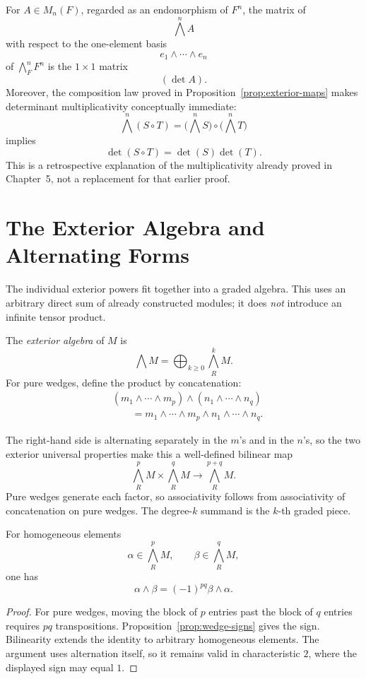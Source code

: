 For \(A\in M_n(F)\), regarded as an endomorphism of \(F^n\), the matrix of
\[
\bigwedge^nA
\]
with respect to the one-element basis
\[
e_1\wedge\cdots\wedge e_n
\]
of \(\bigwedge_F^nF^n\) is the \(1\times1\) matrix
\[
(\det A).
\]
Moreover, the composition law proved in Proposition~\ref{prop:exterior-maps}
makes determinant multiplicativity conceptually immediate:
\[
\bigwedge^n(S\circ T)
=\bigl(\bigwedge^nS\bigr)\circ\bigl(\bigwedge^nT\bigr)
\]
implies
\[
\det(S\circ T)=\det(S)\det(T).
\]
This is a retrospective explanation of the multiplicativity already proved
in Chapter~5, not a replacement for that earlier proof.

\section{The Exterior Algebra and Alternating Forms}\label{sec:exterior-forms}
The individual exterior powers fit together into a graded algebra.  This
uses an arbitrary direct sum of already constructed modules; it does
\emph{not} introduce an infinite tensor product.

\begin{definition}
The \emph{exterior algebra} of \(M\) is
\[
\bigwedge M
=\bigoplus_{k\geq0}\bigwedge_R^kM.
\]
For pure wedges, define the product by concatenation:
\[
\begin{aligned}
&(m_1\wedge\cdots\wedge m_p)
\wedge
(n_1\wedge\cdots\wedge n_q)\\
&\qquad =
m_1\wedge\cdots\wedge m_p
\wedge n_1\wedge\cdots\wedge n_q.
\end{aligned}
\]
\end{definition}

The right-hand side is alternating separately in the \(m\)'s and in the
\(n\)'s, so the two exterior universal properties make this a well-defined
bilinear map
\[
\bigwedge_R^pM\times\bigwedge_R^qM
\longrightarrow
\bigwedge_R^{p+q}M.
\]
Pure wedges generate each factor, so associativity follows from associativity
of concatenation on pure wedges.  The degree-\(k\) summand is the \(k\)-th
graded piece.

\begin{proposition}
For homogeneous elements
\[
\alpha\in\bigwedge_R^pM,
\qquad
\beta\in\bigwedge_R^qM,
\]
one has
\[
\alpha\wedge\beta=(-1)^{pq}\beta\wedge\alpha.
\]
\end{proposition}
\begin{proof}
For pure wedges, moving the block of \(p\) entries past the block of \(q\)
entries requires \(pq\) transpositions.  Proposition~\ref{prop:wedge-signs}
gives the sign.  Bilinearity extends the identity to arbitrary homogeneous
elements.  The argument uses alternation itself, so it remains valid in
characteristic \(2\), where the displayed sign may equal \(1\).
\end{proof}

